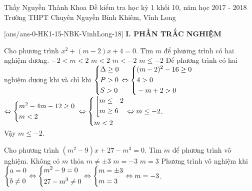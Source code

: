 	\begin{name}
		{Thầy Nguyễn Thành Khoa}
		{Đề kiểm tra học kỳ 1 khối 10, năm học 2017 - 2018 Trường THPT Chuyên Nguyễn Bỉnh Khiêm, Vĩnh Long}
	\end{name}
	\setcounter{ex}{0}\setcounter{bt}{0}
	[ans/ans-0-HK1-15-NBK-VinhLong-18]
\noindent\textbf{I. PHẦN TRẮC NGHIỆM}
\begin{ex}%
Cho phương trình $x^2+(m-2)x+4=0$. Tìm $m$ để phương trình có hai nghiệm dương.
\choice
{$-2<m<2$}
{$m<2$}
{$m<-2$}
{\True $m\le -2$}
\loigiai
{Để phương trình có hai nghiệm dương khi và chỉ khi $\left\{\begin{aligned}& \Delta \ge 0 \\
		& P>0 \\
		& S>0 \\
	\end{aligned}\right.\Leftrightarrow \left\{\begin{aligned}& (m-2)^2-16\ge 0 \\
		& 4>0 \\
		& -m+2>0 \\
	\end{aligned}\right.$\\
$\Leftrightarrow \left\{\begin{aligned}& m^2-4m-12\ge 0 \\
		& m<2 \\
	\end{aligned}\right.$
	$\Leftrightarrow \left\{\begin{aligned}& \left[\begin{aligned}& m\le -2 \\
			& m\ge 6 \\
		\end{aligned}\right. \\
		& m<2 \\
	\end{aligned}\right.\Leftrightarrow m\le -2$.\\
	Vậy $m\le -2$.}
\end{ex}
\begin{ex}%
Cho phương trình $(m^2-9 )x+27-m^3=0$. Tìm $m$ để phương trình vô nghiệm.
\choice
{Không có $m$ thỏa}
{$m\ne \pm 3$}
{\True $m=-3$}
{$m=3$}
\loigiai
{Phương trình vô nghiệm khi $\left\{\begin{aligned}& a=0 \\
		& b\ne 0 \\
	\end{aligned}\right.\Leftrightarrow \left\{\begin{aligned}& {{m}^2}-9= 0 \\
		& 27-{{m}^3}\ne 0 \\
	\end{aligned}\right.\Leftrightarrow \left\{\begin{aligned}& m= \pm 3 \\
		& m=3 \\
	\end{aligned}\right.\Leftrightarrow m=-3$.}
\end{ex}
